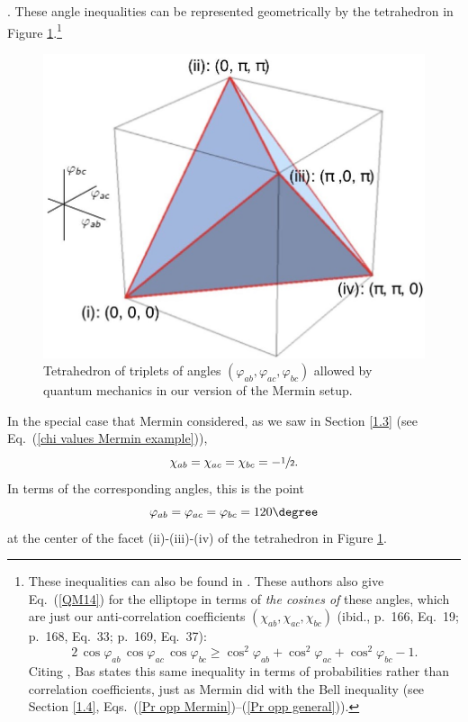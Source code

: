 \citep[p.\ 515; cf.\ the triangle on the right in Figure \ref{vectors4elliptope} in Section \ref{1.6}]{Deza and Laurent 1997}.
These angle inequalities can be represented geometrically by the tetrahedron in Figure \ref{tetrahedron-angles}.\footnote{These inequalities can also be found in \citet[remark on p.\ 170]{Accardi and Fedullo 1982}. These authors also give Eq.\  (\ref{QM14}) for the elliptope in terms of \emph{the cosines of} these angles, which are just our anti-correlation coefficients $(\chi_{ab}, \chi_{ac}, \chi_{bc})$ (ibid., p.\ 166, Eq.\ 19; p.\ 168, Eq.\ 33; p.\ 169, Eq.\ 37):
$$
2 \, \cos{\varphi_{ab}} \, \cos{\varphi_{ac}} \, \cos{\varphi_{bc}} \ge  \cos^2{\!\varphi_{ab}} + \cos^2{\!\varphi_{ac}} + \cos^2{\!\varphi_{bc}} - 1.
$$
Citing \citet{Accardi and Fedullo 1982}, Bas \citet[pp.\ 120--121]{Van Fraassen 1991} states this same inequality in terms of probabilities rather than correlation coefficients, just as Mermin did with the Bell inequality (see Section \ref{1.4}, Eqs.\ (\ref{Pr opp Mermin})--(\ref{Pr opp general})).\label{Accardi Fedullo}}  

\begin{figure}[ht]
 \centering
   \includegraphics[width=4.5in]{tetrahedron-angles.jpeg} 
   \caption{Tetrahedron of triplets of angles $(\varphi_{ab}, \varphi_{ac}, \varphi_{bc})$ allowed by quantum mechanics in our version of the Mermin setup.}
   \label{tetrahedron-angles}
\end{figure} 

In the special case that Mermin considered, as we saw in Section \ref{1.3} (see Eq.\ (\ref{chi values Mermin example})),  
\begin{equation}
\chi_{ab} = \chi_{ac} = \chi_{bc} = -\sfrac12.
\label{chi values Mermin example repeat}
\end{equation}
In terms of the corresponding angles, this is the point
\begin{equation}
\varphi_{ab} = \varphi_{ac} = \varphi_{bc} = 120\degree
\end{equation}
at the center of the facet (ii)-(iii)-(iv) of the tetrahedron in Figure \ref{tetrahedron-angles}. 

